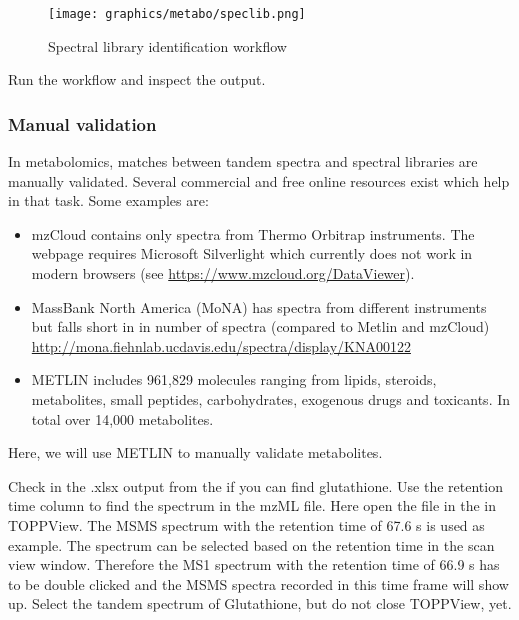 \begin{figure}[htbp]
  \centering
  \texttt{[image: graphics/metabo/speclib.png]}
  \caption{Spectral library identification workflow}
  \label{fig:speclib}
\end{figure}

Run the workflow and inspect the output.

\subsubsection{Manual validation}

In metabolomics, matches between tandem spectra and spectral libraries are manually validated. Several commercial and free online resources exist which help in that task. Some examples are:

\begin{itemize}
\item mzCloud contains only spectra from Thermo Orbitrap instruments. The webpage requires Microsoft Silverlight which currently does not work in modern browsers (see \url{https://www.mzcloud.org/DataViewer}).
\item MassBank North America (MoNA) has spectra from different instruments but falls short in in number of spectra (compared to Metlin and mzCloud) \url{http://mona.fiehnlab.ucdavis.edu/spectra/display/KNA00122}
\item METLIN includes 961,829 molecules ranging from lipids, steroids, metabolites, small peptides, carbohydrates, exogenous drugs and toxicants. In total over 14,000 metabolites.
\end{itemize}

Here, we will use METLIN to manually validate metabolites.

\begin{task}
Check in the .xlsx output from the  if you can find glutathione. Use the retention time column to find the spectrum in the mzML file. Here open the file in the  in  TOPPView. The MSMS spectrum with the retention time of 67.6 s is used as example. The spectrum can be selected based on the retention time in the scan view window. Therefore the MS1 spectrum with the retention time of 66.9 s has to be double clicked and the MSMS spectra recorded in this time frame will show up. Select the tandem spectrum of Glutathione, but do not close TOPPView, yet.
\end{task} 

